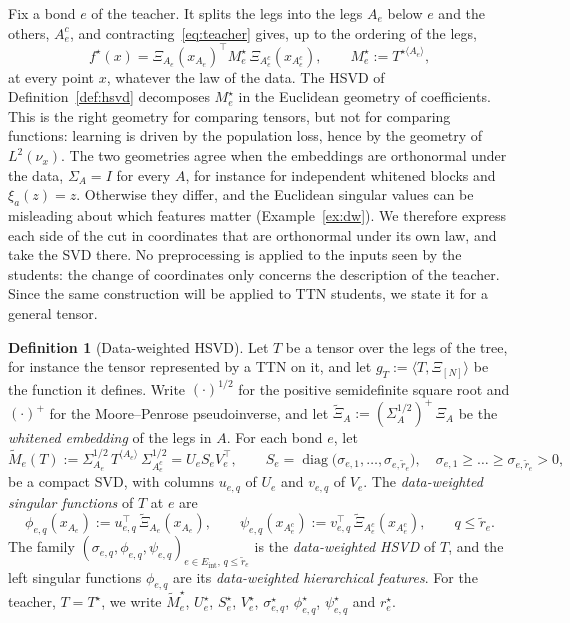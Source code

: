 \documentclass[11pt]{article}
\newcommand{\diag}{\operatorname{diag}}
\newcommand{\Eint}{E_{\mathrm{int}}}
\theoremstyle{definition}
\newtheorem{definition}[theorem]{Definition}
\numberwithin{equation}{section}
\begin{document}
Fix a bond $e$ of the teacher. It splits the legs into the legs $A_e$ below $e$ and the others, $A_e^c$, and contracting~\eqref{eq:teacher} gives, up to the ordering of the legs,
\begin{equation}\label{eq:teacher-cut}
f^\star(x)=\Xi_{A_e}(x_{A_e})^\top M^\star_e\,\Xi_{A_e^c}(x_{A_e^c}),\qquad M^\star_e:=T^{\star\langle A_e\rangle},
\end{equation}
at every point $x$, whatever the law of the data. The HSVD of Definition~\ref{def:hsvd} decomposes $M^\star_e$ in the Euclidean geometry of coefficients. This is the right geometry for comparing tensors, but not for comparing functions: learning is driven by the population loss, hence by the geometry of $L^2(\nu_x)$. The two geometries agree when the embeddings are orthonormal under the data, $\Sigma_A=I$ for every $A$, for instance for independent whitened blocks and $\xi_a(z)=z$. Otherwise they differ, and the Euclidean singular values can be misleading about which features matter (Example~\ref{ex:dw}). We therefore express each side of the cut in coordinates that are orthonormal under its own law, and take the SVD there. No preprocessing is applied to the inputs seen by the students: the change of coordinates only concerns the description of the teacher. Since the same construction will be applied to TTN students, we state it for a general tensor.

\begin{definition}[Data-weighted HSVD]\label{def:dw-hsvd}
Let $T$ be a tensor over the legs of the tree, for instance the tensor represented by a TTN on it, and let $g_T:=\langle T,\Xi_{[N]}\rangle$ be the function it defines. Write $(\cdot)^{1/2}$ for the positive semidefinite square root and $(\cdot)^+$ for the Moore--Penrose pseudoinverse, and let $\tilde\Xi_A:=(\Sigma_A^{1/2})^+\,\Xi_A$ be the \emph{whitened embedding} of the legs in $A$. For each bond $e$, let
\[
\tilde M_e(T):=\Sigma_{A_e}^{1/2}\,T^{\langle A_e\rangle}\,\Sigma_{A_e^c}^{1/2}=U_eS_eV_e^\top,\qquad
S_e=\diag\big(\sigma_{e,1},\dots,\sigma_{e,\tilde r_e}\big),\quad\sigma_{e,1}\ge\dots\ge\sigma_{e,\tilde r_e}>0,
\]
be a compact SVD, with columns $u_{e,q}$ of $U_e$ and $v_{e,q}$ of $V_e$. The \emph{data-weighted singular functions} of $T$ at $e$ are
\begin{equation}\label{eq:singular-functions}
\phi_{e,q}(x_{A_e}):=u^\top_{e,q}\,\tilde\Xi_{A_e}(x_{A_e}),\qquad
\psi_{e,q}(x_{A_e^c}):=v^\top_{e,q}\,\tilde\Xi_{A_e^c}(x_{A_e^c}),\qquad q\le\tilde r_e .
\end{equation}
The family $(\sigma_{e,q},\phi_{e,q},\psi_{e,q})_{e\in\Eint,\,q\le\tilde r_e}$ is the \emph{data-weighted HSVD} of $T$, and the left singular functions $\phi_{e,q}$ are its \emph{data-weighted hierarchical features}. For the teacher, $T=T^\star$, we write $\tilde M^\star_e$, $U^\star_e$, $S^\star_e$, $V^\star_e$, $\sigma^\star_{e,q}$, $\phi^\star_{e,q}$, $\psi^\star_{e,q}$ and $r^\star_e$.
\end{definition}
\end{document}

